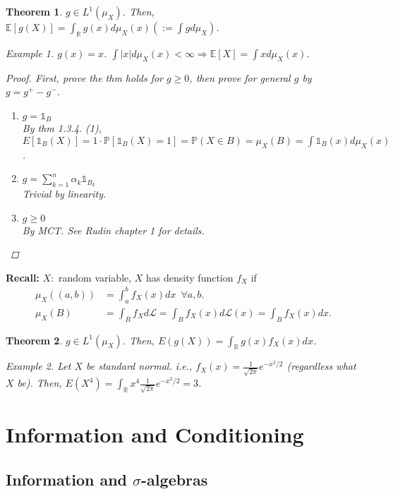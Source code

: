 \documentclass[12pt]{report}
\renewcommand{\1}{\mathbb{1}}
\theoremstyle{break}
\newtheorem{thm}{Theorem}[section] %
\theoremstyle{newdef}
\theoremstyle{remark}
\newtheorem*{exmp}{Example} %
\begin{document}
\begin{thm}
$g \in L^1(\mu_X)$.
Then, 
$\mathbb{E}[g(X)] = \int_\mathbb{R} g(x)d\mu_X(x) (:= \int g d\mu_X)$.

\begin{exmp}
$g(x) = x$.
$\int |x| d\mu_X(x) < \infty \Rightarrow \mathbb{E}[X] = \int xd\mu_X(x)$.
\end{exmp}

\begin{proof}
First, prove the thm holds for $g \geq 0$, then prove for general $g$ by $g = g^+ - g^-$.
\begin{enumerate}[label = (\arabic*)]
\item $g = \mathbb{1}_B$\\
By thm 1.3.4. (1), $E[\mathbb{1}_B(X)] = 1 \cdot \mathbb{P}[\mathbb{1}_B(X) = 1] = \mathbb{P}(X\in B) = \mu_X(B)
= \int \mathbb{1}_B(x) d\mu_X(x)$.
\item $g = \sum_{k=1}^n \alpha_k \mathbb{1}_{B_k}$\\
Trivial by linearity.
\item $g \geq 0$\\
By MCT.
See \textit{Rudin} chapter 1 for details.
\end{enumerate}
\end{proof}
\end{thm}


\textbf{Recall:} $X:$ random variable, $X$ has density function $f_X$ if
$$
\begin{aligned}
\mu_X((a,b)) &= \int_a^b f_X(x)dx \enspace \forall a,b.\\
\mu_X(B) &= \int_B f_Xd\mathcal{L} = \int_B f_X(x) d\mathcal{L}(x) = \int_B f_X(x)dx.
\end{aligned}
$$

\begin{thm}
$g \in L^1(\mu_X)$.
Then, $E(g(X)) = \int_\mathbb{R} g(x)f_X(x)dx$.

\begin{exmp}
Let $X$ be standard normal. i.e., $f_X(x) = \frac{1}{\sqrt{2\pi}}e^{-x^2/2}$ (regardless what $X$ be).
Then, $E(X^4) = \int_\mathbb{R} x^4 \frac{1}{\sqrt{2\pi}} e^{-x^2/2} = 3$.
\end{exmp}
\end{thm}



\chapter{Information and Conditioning}
\section{Information and $\sigma$-algebras}
\end{document}
